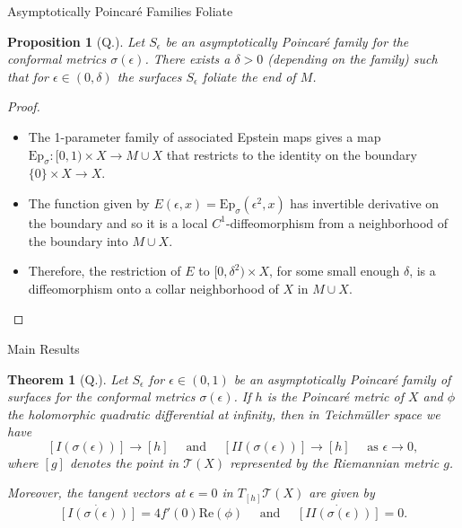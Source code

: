 \documentclass[professionalfont]{beamer}
\newtheorem*{thm*}{Theorem}
\newtheorem*{prop*}{Proposition}
\newcommand{\two}{I\!I}
\begin{document}
\begin{frame}{Asymptotically Poincar\'e Families Foliate}

\begin{prop*}[Q.]
Let $S_\epsilon$ be an asymptotically Poincar\'e family for the conformal metrics $\sigma(\epsilon)$. There exists a $\delta > 0$ (depending on the family) such that for $\epsilon \in (0,\delta)$ the surfaces $S_\epsilon$ foliate the end of $M$.
\end{prop*} \pause

\begin{proof}

\begin{itemize}

\item The 1-parameter family of associated Epstein maps gives a map $\mathrm{Ep}_{\sigma}: [0,1) \times X \to M \cup X$ that restricts to the identity on the boundary $\{ 0 \} \times X \to X$. \pause

\item The function given by $E(\epsilon,x) = \mathrm{Ep}_\sigma(\epsilon^2,x)$ has invertible derivative on the boundary and so it is a local $C^1$-diffeomorphism from a neighborhood of the boundary into $M \cup X$. \pause

\item Therefore, the restriction of $E$ to $[0, \delta^2) \times X$, for some small
enough $\delta$, is a diffeomorphism onto a collar neighborhood of $X$ in $M \cup X$.

\end{itemize}

\end{proof}

\end{frame}


%


\begin{frame}{Main Results}

\begin{thm*}[Q.]
Let $S_\epsilon$ for $\epsilon \in (0,1)$ be an asymptotically Poincar\'e family of surfaces for the conformal metrics $\sigma(\epsilon)$. 
If $h$ is the Poincar\'e metric of $X$ and $\phi$  the holomorphic quadratic differential at infinity, then in Teichm\"uller space we have 
\[
[I(\sigma(\epsilon))] \to [h]
\quad \text{ and } \quad
[\two(\sigma(\epsilon))] \to [h]
\quad \text{ as } \epsilon \to 0,
\]
where $[g]$ denotes the point in $\mathcal{T}(X)$ represented by the Riemannian metric $g$.
\newline 

Moreover, the tangent vectors at $\epsilon = 0$ in $T_{[h]} \mathcal{T}(X)$ are given by 
\[
\dot{[I(\sigma(\epsilon))]}  = 4 f'(0) \mathrm{Re}(\phi) \quad \text{ and } \quad \dot{[\two(\sigma(\epsilon))]} = 0.
\]
\end{thm*}

\end{frame}
\end{document}
